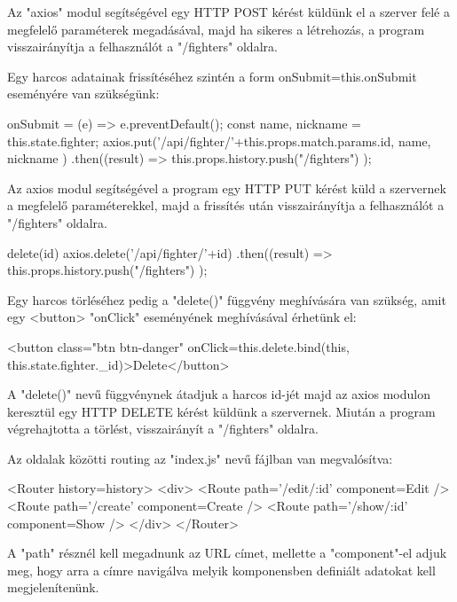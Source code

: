 Az "axios" modul segítségével egy HTTP POST kérést küldünk el a szerver felé a megfelelő paraméterek megadásával, majd ha sikeres a létrehozás, a program visszairányítja a felhasználót a "/fighters" oldalra.

Egy harcos adatainak frissítéséhez szintén a form onSubmit={this.onSubmit} eseményére van szükségünk:

\begin{cpp}
onSubmit = (e) => {
    e.preventDefault();
    const { name, nickname } = this.state.fighter;
    axios.put('/api/fighter/'+this.props.match.params.id, { name, 
    nickname })
      .then((result) => {
        this.props.history.push("/fighters")
      });}
\end{cpp}

Az axios modul segítségével a program egy HTTP PUT kérést küld a szervernek a megfelelő paraméterekkel, majd a frissítés után visszairányítja a felhasználót a "/fighters" oldalra.

\begin{cpp}
delete(id){
    axios.delete('/api/fighter/'+id)
      .then((result) => {
        this.props.history.push("/fighters")
      });}
\end{cpp}

Egy harcos törléséhez pedig a "delete()" függvény meghívására van szükség, amit egy <button> "onClick" eseményének meghívásával érhetünk el:

\begin{cpp}
<button class="btn btn-danger" onClick={this.delete.bind(this, 
this.state.fighter._id)}>Delete</button>
\end{cpp}

A "delete()" nevű függvénynek átadjuk a harcos id-jét majd az axios modulon keresztül egy HTTP DELETE kérést küldünk a szervernek. Miután a program végrehajtotta a törlést, visszairányít a "/fighters" oldalra.


Az oldalak közötti routing az "index.js" nevű fájlban van megvalósítva:

\begin{cpp}
<Router history={history}>
	<div>
	<Route path='/edit/:id' component={Edit} />
        <Route path='/create' component={Create} />
        <Route path='/show/:id' component={Show} />
	</div>
</Router>
\end{cpp}

A "path" résznél kell megadnunk az URL címet, mellette a "component"-el adjuk meg, hogy arra a címre navigálva melyik komponensben definiált adatokat kell megjelenítenünk.

